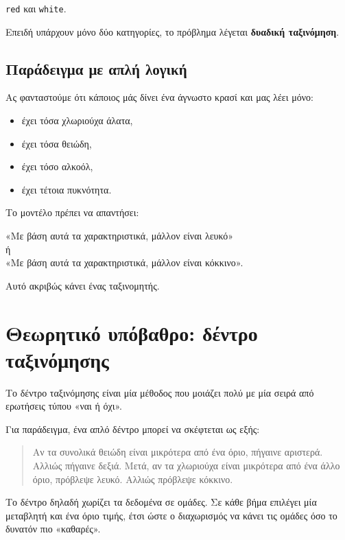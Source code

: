 \documentclass[12pt,a4paper]{article}
\newcommand{\code}[1]{\texttt{\textenglish{#1}}}
\begin{document}
\begin{center}
\code{red} και \code{white}.
\end{center}

Επειδή υπάρχουν μόνο δύο κατηγορίες, το πρόβλημα λέγεται
\textbf{δυαδική ταξινόμηση}.

\subsection{Παράδειγμα με απλή λογική}

Ας φανταστούμε ότι κάποιος μάς δίνει ένα άγνωστο κρασί και μας λέει μόνο:

\begin{itemize}[nosep]
    \item έχει τόσα χλωριούχα άλατα,
    \item έχει τόσα θειώδη,
    \item έχει τόσο αλκοόλ,
    \item έχει τέτοια πυκνότητα.
\end{itemize}

Το μοντέλο πρέπει να απαντήσει:

\begin{center}
«Με βάση αυτά τα χαρακτηριστικά, μάλλον είναι λευκό» \\
ή \\
«Με βάση αυτά τα χαρακτηριστικά, μάλλον είναι κόκκινο».
\end{center}

Αυτό ακριβώς κάνει ένας ταξινομητής.

\section{Θεωρητικό υπόβαθρο: δέντρο ταξινόμησης}

Το δέντρο ταξινόμησης είναι μία μέθοδος που μοιάζει πολύ με μία σειρά από
ερωτήσεις τύπου «ναι ή όχι».

Για παράδειγμα, ένα απλό δέντρο μπορεί να σκέφτεται ως εξής:

\begin{quote}
Αν τα συνολικά θειώδη είναι μικρότερα από ένα όριο, πήγαινε αριστερά.
Αλλιώς πήγαινε δεξιά. Μετά, αν τα χλωριούχα είναι μικρότερα από ένα άλλο
όριο, πρόβλεψε λευκό. Αλλιώς πρόβλεψε κόκκινο.
\end{quote}

Το δέντρο δηλαδή χωρίζει τα δεδομένα σε ομάδες. Σε κάθε βήμα επιλέγει μία
μεταβλητή και ένα όριο τιμής, έτσι ώστε ο διαχωρισμός να κάνει τις ομάδες όσο
το δυνατόν πιο «καθαρές».
\end{document}
